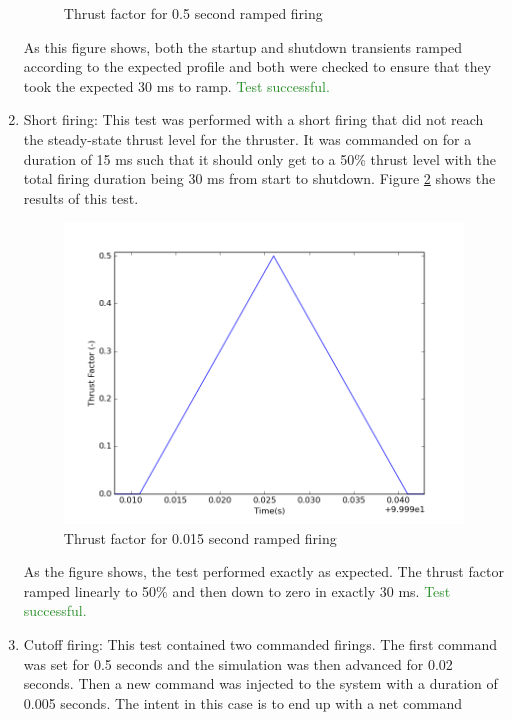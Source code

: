 \documentclass[]{LASPreport}
\begin{document}
\begin{enumerate}
{\begin{figure}[htb]
{            }
            \caption{Thrust factor for 0.5 second ramped firing}
            \label{fig:first_ramp_fir}
    \end{figure}
    As this figure shows, both the startup and shutdown transients ramped 
    according to the expected profile and both were checked to ensure that 
    they took the expected 30 ms to ramp. 
    \textcolor{ForestGreen}{Test successful.}
}
\item{Short firing:  This test was performed with a short firing that did not 
    reach the steady-state thrust level for the thruster.  It was commanded on 
    for a duration of 15 ms such that it should only get to a 50\% thrust level 
    with the total firing duration being 30 ms from start to shutdown.  Figure 
    \ref{fig:short_ramp_fir} shows the results of this test.
    \begin{figure}[htb]
            \centerline{
            \includegraphics[scale=0.5]{Figures/shortRampFiring}
            }
            \caption{Thrust factor for 0.015 second ramped firing}
            \label{fig:short_ramp_fir}
    \end{figure}
    As the figure shows, the test performed exactly as expected.  The thrust 
    factor ramped linearly to 50\% and then down to zero in exactly 30 ms.  
    	\textcolor{ForestGreen}{Test successful.}
}
\item{Cutoff firing:  This test contained two commanded firings.  The first 
    command was set for 0.5 seconds and the simulation was then advanced for 
    0.02 seconds.  Then a new command was injected to the system with a duration 
    of 0.005 seconds.  The intent in this case is to end up with a net command 
}
\end{enumerate}
\end{document}
